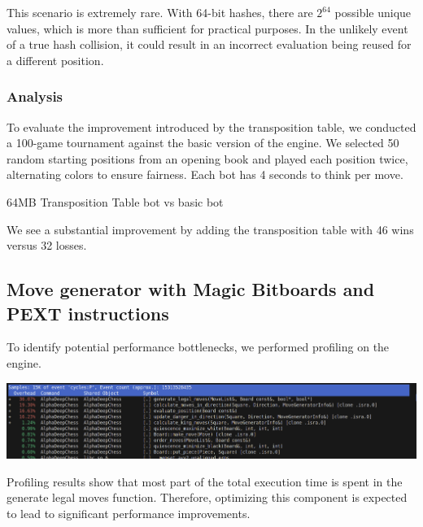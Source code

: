 \vspace{1em}

\noindent This scenario is extremely rare. With 64-bit hashes, there are $2^{64}$ possible unique values, which is more than sufficient for practical purposes. In the unlikely event of a true hash collision, it could result in an incorrect evaluation being reused for a different position.

\subsubsection{Analysis}

To evaluate the improvement introduced by the transposition table, we conducted a 100-game tournament against the basic version of the engine. We selected 50 random starting positions from an opening book and played each position twice, alternating colors to ensure fairness. Each bot has 4 seconds to think per move.

\begin{center}
64MB Transposition Table bot vs basic bot\\
\medskip
\end{center}

\noindent We see a substantial improvement by adding the transposition table with 46 wins versus 32 losses.

\subsection{Move generator with Magic Bitboards and PEXT instructions}

To identify potential performance bottlenecks, we performed profiling on the engine.

\begin{center}
    \includegraphics[width=1.0\textwidth]{Imagenes/basic_move_generator_profiling.png}
\end{center}

\noindent Profiling results show that most part of the total execution time is spent in the generate legal moves function. Therefore, optimizing this component is expected to lead to significant performance improvements.

